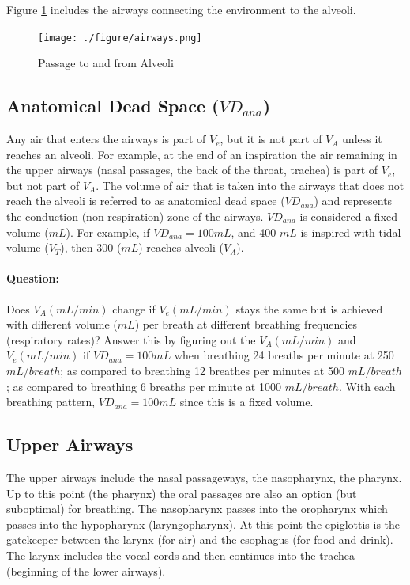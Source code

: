 Figure \ref{fig:airways} includes the airways connecting the environment to the alveoli.

\begin{figure}[!h]
    \centering
    \texttt{[image: ./figure/airways.png]}
    \caption{Passage to and from Alveoli}
    \label{fig:airways}
\end{figure}

\subsection{Anatomical Dead Space ($VD_{ana}$)}

Any air that enters the airways is part of $V_e$, but it is not part of $V_A$ unless it reaches an alveoli. For example, at the end of an inspiration the air remaining in the upper airways (nasal passages, the back of the throat, trachea) is part of $V_e$, but not part of $V_A$. The volume of air that is taken into the airways that does not reach the alveoli is referred to as anatomical dead space ($VD_{ana}$) and represents the conduction (non respiration) zone of the airways. $VD_{ana}$ is considered a fixed volume ($mL$). For example, if $VD_{ana} = 100 mL$, and 400 $mL$ is inspired with tidal volume ($V_T$), then 300 ($mL$) reaches alveoli ($V_A$). 

\paragraph{Question:}

Does $V_A (mL/min)$ change if $V_e (mL/min)$ stays the same but is achieved with different volume ($mL$) per breath at different breathing frequencies (respiratory rates)? Answer this by figuring out the $V_A (mL/min)$ and $V_e (mL/min)$ if $VD_{ana} = 100 mL$ when breathing 24 breaths per minute at 250 $mL/breath$; as compared to breathing 12 breathes per minutes at 500 $mL/breath$; as compared to breathing 6 breaths per minute at 1000 $mL/breath$. With each breathing pattern, $VD_{ana} = 100 mL$ since this is a fixed volume.

\subsection{Upper Airways}

The upper airways include the nasal passageways, the nasopharynx, the pharynx. Up to this point (the pharynx) the oral passages are also an option (but suboptimal) for breathing. The nasopharynx passes into the oropharynx which passes into the hypopharynx (laryngopharynx). At this point the epiglottis is the gatekeeper between the larynx (for air) and the esophagus (for food and drink).  The larynx includes the vocal cords and then continues into the trachea (beginning of the lower airways). 

